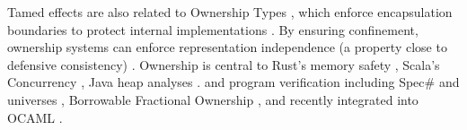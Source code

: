 
















Tamed effects are also related to
Ownership Types 
\cite{simpleOwnership,existOwn},
which
enforce  encapsulation boundaries
to protect internal implementations
\cite{ownalias,NobPotVitECOOP98}.
By ensuring confinement, ownership
systems can enforce representation independence (a property close to
defensive consistency)
\cite{Banerjee:2005}.
%
Ownership is central to Rust's memory safety
\cite{RustPL2,RustBelt18},
Scala's Concurrency \cite{ScalaCapabilities,ScalaLightweightAffine},
Java heap analyses \cite{PotterNC98,HillNP02,MitECOOP06}. and
program verification
\cite{BoyLisShrPOPL03,hypervisor} including Spec$\#$
\cite{BarLeiSch05,BarDelFahLeiSch04} and universes
\cite{DieDroMue07,DietlMueller05,LuPotPOPL06},
Borrowable Fractional Ownership \cite{borrow-fract-vmcai2024},
and recently integrated into OCAML \cite{ocaml-ownership-icfp2024,funk-ownership-oopsla2024}.





